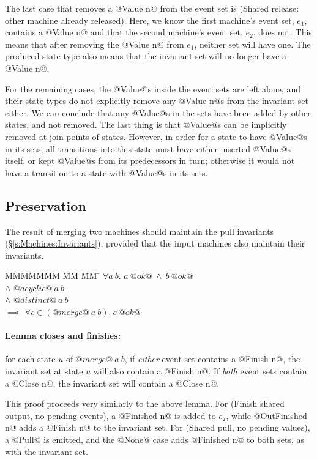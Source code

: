 The last case that removes a @Value n@ from the event set is (Shared release: other machine already released).
Here, we know the first machine's event set, $e_1$, contains a @Value n@ and that the second machine's event set, $e_2$, does not.
This means that after removing the @Value n@ from $e_1$, neither set will have one.
The produced state type also means that the invariant set will no longer have a @Value n@.

For the remaining cases, the @Value@s inside the event sets are left alone, and their state types do not explicitly remove any @Value n@s from the invariant set either.
We can conclude that any @Value@s in the sets have been added by other states, and not removed.
The last thing is that @Value@s can be implicitly removed at join-points of states.
However, in order for a state to have @Value@s in its sets, all transitions into this state must have either inserted @Value@s itself, or kept @Value@s from its predecessors in turn; otherwise it would not have a transition to a state with @Value@s in its sets.


\subsection{Preservation}
The result of merging two machines should maintain the pull invariants (\S\ref{s:Machines:Invariants}), provided that the input machines also maintain their invariants.

\begin{tabbing}
MMMMMMM \= MM \= MM \= \kill
$\forall a~b.$
\>
\> $a~@ok@~\wedge~b~@ok@$
\\
\> $\wedge$
\> $@acyclic@~a~b$
\\
\> $\wedge$
\> $@distinct@~a~b$
\\
\> $\implies$
\> $\forall c \in (@merge@~a~b).\ c~@ok@$
\end{tabbing}

\paragraph{Lemma closes and finishes:} 
for each state $u$ of $@merge@~a~b$, if \emph{either} event set contains a @Finish n@, the invariant set at state $u$ will also contain a @Finish n@.
If \emph{both} event sets contain a @Close n@, the invariant set will contain a @Close n@.

This proof proceeds very similarly to the above lemma.
For (Finish shared output, no pending events), a @Finished n@ is added to $e_2$, while @OutFinished n@ adds a @Finish n@ to the invariant set.
For (Shared pull, no pending values), a @Pull@ is emitted, and the @None@ case adds @Finished n@ to both sets, as with the invariant set.


